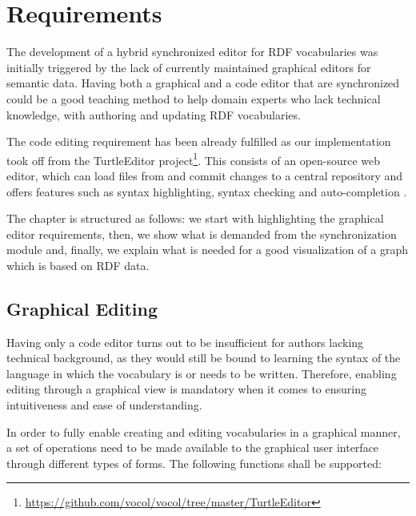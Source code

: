 \chapter{Requirements}
\label{ch:requirements}

The development of a hybrid synchronized editor for RDF vocabularies was initially triggered by the lack of currently maintained graphical editors for semantic data. Having both a graphical and a code editor that are synchronized could be a good teaching method to help domain experts who lack technical knowledge, with authoring and updating RDF vocabularies.

The code editing requirement has been already fulfilled as our implementation took off from the TurtleEditor project\footnote{\url{https://github.com/vocol/vocol/tree/master/TurtleEditor}}. This consists of an open-source
web editor, which can load files from and commit changes to a central repository and offers features such as syntax highlighting, syntax checking and auto-completion \cite{Petersen2016}.

The chapter is structured as follows: we start with highlighting the graphical editor requirements, then, we show what is demanded from the synchronization module and, finally, we explain what is needed for a good visualization of a graph which is based on RDF data. 


\section {Graphical Editing}

Having only a code editor turns out to be insufficient for authors lacking technical background, as they would still be bound to learning the syntax of the language in which the vocabulary is or needs to be written. Therefore, enabling editing through a graphical view is mandatory when it comes to ensuring intuitiveness and ease of understanding. 

In order to fully enable creating and editing vocabularies in a graphical manner, a set of operations need to be made available to the graphical user interface through different types of forms. The following functions shall be supported:

